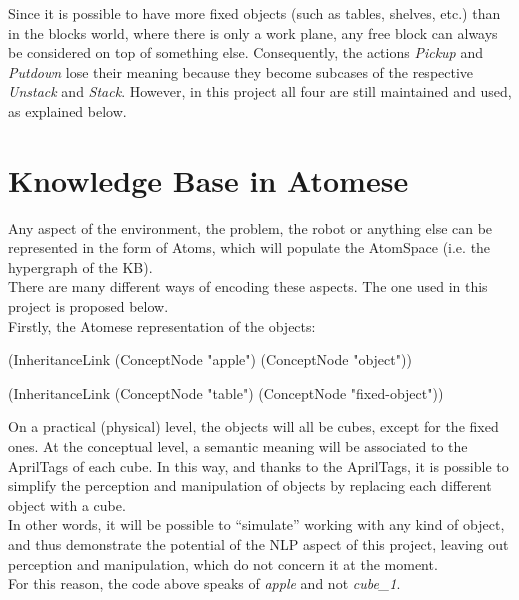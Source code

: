 Since it is possible to have more fixed objects (such as tables, shelves, etc.) than in the blocks world, where there is only a work plane, any free block can always be considered on top of something else. Consequently, the actions \textit{Pickup} and \textit{Putdown} lose their meaning because they become subcases of the respective \textit{Unstack} and \textit{Stack}. However, in this project all four are still maintained and used, as explained below. 


\section{Knowledge Base in Atomese}\label{sec:env_atomese}

Any aspect of the environment, the problem, the robot or anything else can be represented in the form of Atoms, which will populate the AtomSpace (i.e. the hypergraph of the KB). \\
There are many different ways of encoding these aspects. The one used in this project is proposed below. \\

Firstly, the Atomese representation of the objects: \\
\begin{python}
	(InheritanceLink
		(ConceptNode "apple")
		(ConceptNode "object"))

	(InheritanceLink
		(ConceptNode "table")
		(ConceptNode "fixed-object"))
\end{python}
On a practical (physical) level, the objects will all be cubes, except for the fixed ones. At the conceptual level, a semantic meaning will be associated to the AprilTags of each cube. In this way, and thanks to the AprilTags, it is possible to simplify the perception and manipulation of objects by replacing each different object with a cube. \\
In other words, it will be possible to \enquote{simulate} working with any kind of object, and thus demonstrate the potential of the NLP aspect of this project, leaving out perception and manipulation, which do not concern it at the moment. \\
For this reason, the code above speaks of \textit{apple} and not \textit{cube\_1}. \\


